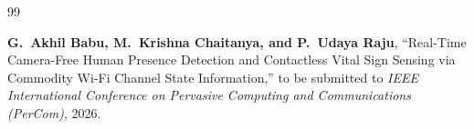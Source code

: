 \newpage
\renewcommand{\bibname}{List of Publications}

\begin{thebibliography}{99}

{\bfseries G.~Akhil Babu, M.~Krishna Chaitanya, and P.~Udaya Raju}, ``Real-Time Camera-Free Human Presence Detection and Contactless Vital Sign Sensing via Commodity Wi-Fi Channel State Information,'' to be submitted to {\em IEEE International Conference on Pervasive Computing and Communications (PerCom)}, 2026.

\end{thebibliography}
